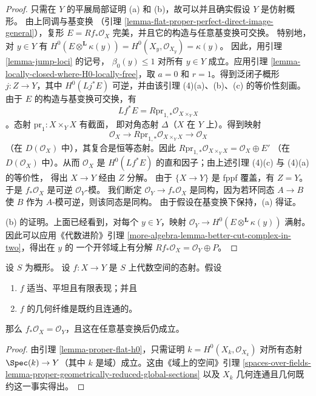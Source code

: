 \begin{proof}
只需在 $Y$ 的平展局部证明 (a) 和 (b)，故可以并且确实假设
$Y$ 是仿射概形。
由上同调与基变换
（引理 \ref{lemma-flat-proper-perfect-direct-image-general}），复形
$E = Rf_*\mathcal{O}_X$
完美，并且它的构造与任意基变换可交换。
特别地，对 $y \in Y$ 有
$H^0(E \otimes^\mathbf{L} \kappa(y)) =
H^0(X_y, \mathcal{O}_{X_y}) = \kappa(y)$。
因此，用引理 \ref{lemma-jump-loci} 的记号，
$\beta_0(y) \leq 1$ 对所有 $y \in Y$ 成立。应用引理
\ref{lemma-locally-closed-where-H0-locally-free}，取
$a = 0$ 和 $r = 1$。得到泛闭子概形
$j : Z \to Y$，其中 $H^0(Lj^*E)$ 可逆，并由该引理
(4)(a)、(b)、(c) 的等价性刻画。
由于 $E$ 的构造与基变换可交换，有
$$
Lf^*E = R\text{pr}_{1, *}\mathcal{O}_{X \times_Y X}
$$
。态射 $\text{pr}_1 : X \times_Y X$ 有截面，
即对角态射 $\Delta$（$X$ 在 $Y$ 上）。得到映射
$$
\mathcal{O}_X \longrightarrow R\text{pr}_{1, *}\mathcal{O}_{X \times_Y X}
\longrightarrow \mathcal{O}_X
$$
（在 $D(\mathcal{O}_X)$ 中），其复合是恒等态射。因此
$R\text{pr}_{1, *}\mathcal{O}_{X \times_Y X} = \mathcal{O}_X \oplus E'$
（在 $D(\mathcal{O}_X)$ 中）。从而 $\mathcal{O}_X$ 是
$H^0(Lf^*E)$ 的直和因子；由上述引理 (4)(c) 与 (4)(a) 的等价性，
得出 $X \to Y$ 经由 $Z$ 分解。
由于 $\{X \to Y\}$ 是 fppf 覆盖，有 $Z = Y$。
于是 $f_*\mathcal{O}_X$ 是可逆 $\mathcal{O}_Y$-模。
我们断定 $\mathcal{O}_Y \to f_*\mathcal{O}_X$ 是同构，因为若环同态
$A \to B$ 使 $B$ 作为 $A$-模可逆，则该同态是同构。
由于假设在基变换下保持，(a) 得证。

\medskip\noindent
(b) 的证明。上面已经看到，对每个 $y \in Y$，映射
$\mathcal{O}_Y \to H^0(E \otimes^\mathbf{L} \kappa(y))$ 满射。
因此可以应用《代数进阶》引理
\ref{more-algebra-lemma-better-cut-complex-in-two}，得出在 $y$ 的
一个开邻域上有分解
$Rf_*\mathcal{O}_X = \mathcal{O}_Y \oplus P$。
\end{proof}

\begin{lemma}
\label{lemma-proper-flat-geom-red-connected}
设 $S$ 为概形。
设 $f : X \to Y$ 是 $S$ 上代数空间的态射。假设
\begin{enumerate}
\item $f$ 适当、平坦且有限表现；并且
\item $f$ 的几何纤维是既约且连通的。
\end{enumerate}
那么 $f_*\mathcal{O}_X = \mathcal{O}_Y$，且这在任意基变换后仍成立。
\end{lemma}

\begin{proof}
由引理 \ref{lemma-proper-flat-h0}，只需证明
$k = H^0(X_k, \mathcal{O}_{X_k})$ 对所有态射
$\Spec(k) \to Y$（其中 $k$ 是域）成立。这由《域上的空间》引理
\ref{spaces-over-fields-lemma-proper-geometrically-reduced-global-sections}
以及 $X_k$ 几何连通且几何既约这一事实得出。
\end{proof}

